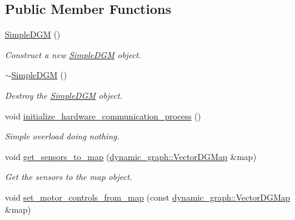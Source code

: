 \subsection*{Public Member Functions}
\begin{DoxyCompactItemize}
\item 
\mbox{\label{classdynamic__graph__manager_1_1SimpleDGM_abb548458a154ee8e9ae63a32f1191ef6}} 
\hyperlink{classdynamic__graph__manager_1_1SimpleDGM_abb548458a154ee8e9ae63a32f1191ef6}{Simple\+D\+GM} ()
\begin{DoxyCompactList}\small\item\em Construct a new \hyperlink{classdynamic__graph__manager_1_1SimpleDGM}{Simple\+D\+GM} object. \end{DoxyCompactList}\item 
\mbox{\label{classdynamic__graph__manager_1_1SimpleDGM_a250f18b97619c72446074662626423d4}} 
\hyperlink{classdynamic__graph__manager_1_1SimpleDGM_a250f18b97619c72446074662626423d4}{$\sim$\+Simple\+D\+GM} ()
\begin{DoxyCompactList}\small\item\em Destroy the \hyperlink{classdynamic__graph__manager_1_1SimpleDGM}{Simple\+D\+GM} object. \end{DoxyCompactList}\item 
void \hyperlink{classdynamic__graph__manager_1_1SimpleDGM_a5d771fc5a9ae6dd524a658d50fbee5d3}{initialize\+\_\+hardware\+\_\+communication\+\_\+process} ()
\begin{DoxyCompactList}\small\item\em Simple overload doing nothing. \end{DoxyCompactList}\item 
void \hyperlink{classdynamic__graph__manager_1_1SimpleDGM_aa92cd33a31c934835252f834bab7b9f4}{get\+\_\+sensors\+\_\+to\+\_\+map} (\hyperlink{namespacedynamic__graph_abd184187f3bc15df5e227d866529e4a7}{dynamic\+\_\+graph\+::\+Vector\+D\+G\+Map} \&map)
\begin{DoxyCompactList}\small\item\em Get the sensors to the map object. \end{DoxyCompactList}\item 
void \hyperlink{classdynamic__graph__manager_1_1SimpleDGM_ad38ccd35cc0c409a0aaefa8565634109}{set\+\_\+motor\+\_\+controls\+\_\+from\+\_\+map} (const \hyperlink{namespacedynamic__graph_abd184187f3bc15df5e227d866529e4a7}{dynamic\+\_\+graph\+::\+Vector\+D\+G\+Map} \&map)

\end{DoxyCompactItemize}
